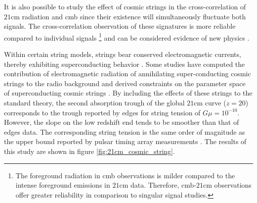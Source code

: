 \documentclass[12pt, TexShade, letterpaper]{report}
\begin{document}
It is also possible to study the effect of cosmic strings in the cross-correlation of $\mathrm{21cm}$ radiation and \gls{cmb} since their existence will simultaneously fluctuate both signals. The cross-correlation observation of these signatures is more reliable compared to individual signals \footnote{The foreground radiation in \gls{cmb} observations is milder compared to the intense foreground emissions in $\mathrm{21cm}$ data. Therefore, 
\gls{cmb}-$\mathrm{21cm}$ observations offer greater reliability in comparison to singular signal studies.} and can be considered evidence of new physics \cite{corre_21cm_cmb}.

Within certain string models, strings bear conserved electromagnetic currents, thereby exhibiting superconducting behavior \cite{constrain_superconduct}. Some studies have computed the contribution of electromagnetic radiation of annihilating super-conducting cosmic strings to the radio background and derived constraints on the parameter space of superconducting cosmic strings \cite{constrain_superconduct, constrain_spectral_bryce, massive_BH}. By including the effects of these strings to the standard theory, the second absorption trough of the global $\mathrm{21cm}$ curve ($z=20$) corresponds to the trough reported by \gls{edges} for string tension of $G\mu = 10 ^{-10}$. However, the slope on the low redshift end tends to be smoother than that of \gls{edges} data. The corresponding string tension is the same order of magnitude as the upper bound reported by pulsar timing array measurements \cite{cosmic_string_jordan_robert, pulsar_timing}. The results of this study are shown in figure \ref{fig:21cm_cosmic_string}.\par
\end{document}
